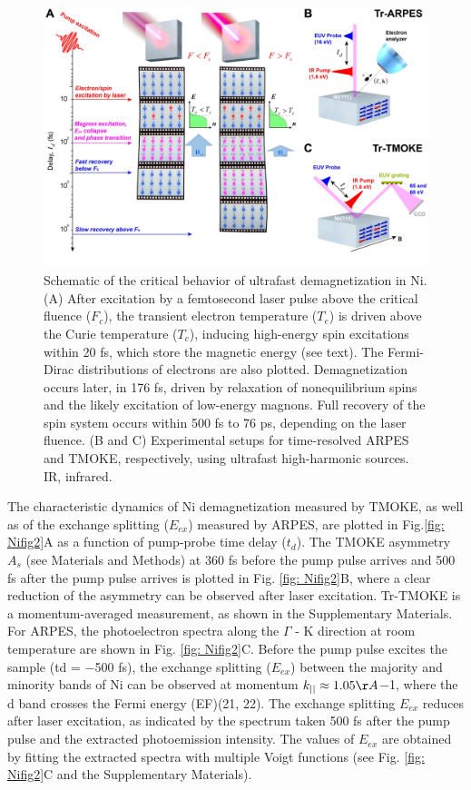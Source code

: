 \begin{figure}[htbp]
	\label{fig: Nifig1}
	\begin{center}
		\includegraphics[width=150mm]{aap9744_Figure_fig1_seq1_v1.pdf}
	\end{center}
	\caption{Schematic of the critical behavior of ultrafast demagnetization in Ni. (A) After excitation by a femtosecond laser pulse above the critical fluence ($F_c$), the transient electron temperature ($T_e$) is driven above the Curie temperature ($T_c$), inducing high-energy spin excitations within 20 fs, which store the magnetic energy (see text). The Fermi-Dirac distributions of electrons are also plotted. Demagnetization occurs later, in 176 fs, driven by relaxation of nonequilibrium spins and the likely excitation of low-energy magnons. Full recovery of the spin system occurs within 500 fs to 76 ps, depending on the laser fluence. (B and C) Experimental setups for time-resolved ARPES and TMOKE, respectively, using ultrafast high-harmonic sources. IR, infrared.}
\end{figure}

The characteristic dynamics of Ni demagnetization measured by TMOKE, as well as of the exchange splitting ($E_{ex}$) measured by ARPES, are plotted in Fig.\ref{fig: Nifig2}A as a function of pump-probe time delay ($t_{d}$). The TMOKE asymmetry $A_{s}$ (see Materials and Methods) at 360 fs before the pump pulse arrives and 500 fs after the pump pulse arrives is plotted in Fig. \ref{fig: Nifig2}B, where a clear reduction of the asymmetry can be observed after laser excitation. Tr-TMOKE is a momentum-averaged measurement, as shown in the Supplementary Materials. For ARPES, the photoelectron spectra along the $\Gamma$ - K direction at room temperature are shown in Fig. \ref{fig: Nifig2}C. Before the pump pulse excites the sample (td = −500 fs), the exchange splitting ($E_{ex}$) between the majority and minority bands of Ni can be observed at momentum  $k_{||} \approx 1.05 \AA$−1, where the d band crosses the Fermi energy (EF)(21, 22). The exchange splitting $E_{ex}$ reduces after laser excitation, as indicated by the spectrum taken 500 fs after the pump pulse and the extracted photoemission intensity. The values of $E_{ex}$ are obtained by fitting the extracted spectra with multiple Voigt functions (see Fig. \ref{fig: Nifig2}C and the Supplementary Materials). 

